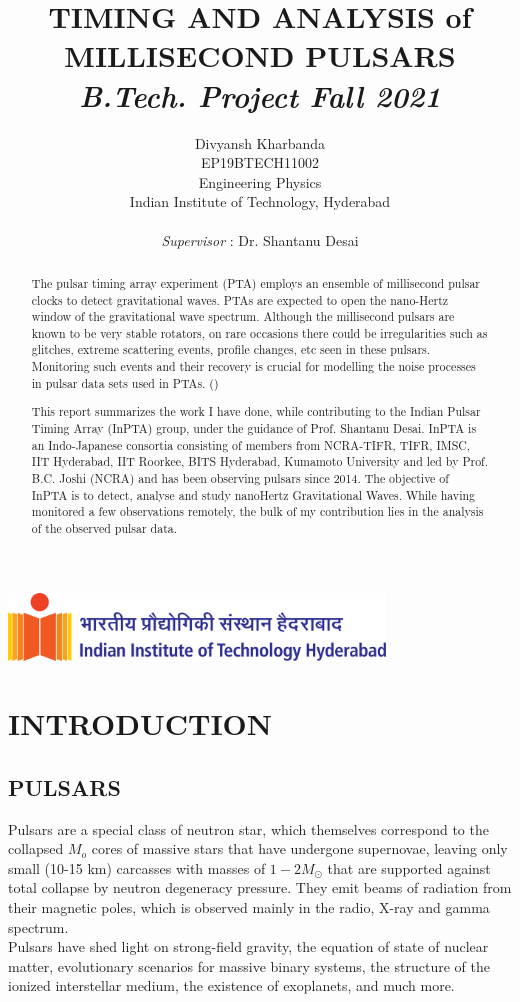 \documentclass{article}
\title{TIMING AND ANALYSIS of MILLISECOND PULSARS\\ \textit{B.Tech. Project Fall 2021}}
\author{\Large
  Divyansh Kharbanda \\
  EP19BTECH11002\\
  Engineering Physics\\
  Indian Institute of Technology, Hyderabad \\\\
  \textit{Supervisor} : Dr. Shantanu Desai
}
\begin{document}
\begin{center}
\includegraphics[width=0.75\textwidth]{Images/horzlogolong.png}
\end{center}
\maketitle 

\newpage
\tableofcontents
\newpage
\begin{abstract}
 The pulsar timing array experiment (PTA) employs an ensemble of millisecond pulsar clocks to detect gravitational waves. PTAs are expected to open the nano-Hertz window of the gravitational wave spectrum. Although the millisecond pulsars are known to be very stable rotators, on rare occasions there could be irregularities such as glitches, extreme scattering events, profile changes, etc seen in these pulsars. Monitoring such events and their recovery is crucial for modelling the noise processes in pulsar data sets used in PTAs. (\cite{taylor2021nanohertz})

This report summarizes the work I have done, while contributing to the Indian Pulsar Timing Array (InPTA) group, under the guidance of Prof. Shantanu Desai. InPTA is an Indo-Japanese consortia consisting of members from NCRA-TIFR, TIFR, IMSC, IIT Hyderabad, IIT Roorkee, BITS Hyderabad, Kumamoto University and  led by Prof. B.C. Joshi (NCRA)  and has been observing pulsars since 2014. The objective of InPTA is to detect, analyse and study nanoHertz Gravitational Waves. While having monitored a few observations remotely, the bulk of my contribution lies in the analysis of the observed pulsar data. 
\end{abstract}
\newpage

\section{INTRODUCTION}
\subsection{PULSARS}
Pulsars are a special class of neutron star, which themselves correspond to the collapsed $M_o$ cores of massive stars that have undergone supernovae, leaving only small (10-15 km) carcasses with masses of $1-2 M_{\odot}$ that are supported against total collapse by neutron degeneracy pressure. They emit beams of radiation from their magnetic poles, which is observed mainly in the radio, X-ray and gamma spectrum.
\\
Pulsars have shed light on strong-field gravity,
the equation of state of nuclear matter, evolutionary scenarios for massive binary systems, the
structure of the ionized interstellar medium, the existence of exoplanets, and much more.
\end{document}
